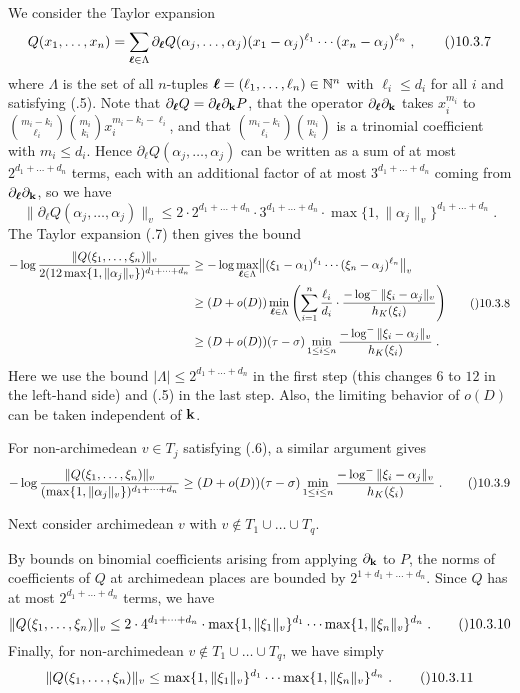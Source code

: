 We consider the Taylor expansion
$$Q(x_1,\dots,x_n)
  = \sum_{\boldsymbol\ell\in\Lambda}
    \partial_{\boldsymbol\ell}Q(\alpha_j,\dots,\alpha_j)
    (x_1-\alpha_j)^{\ell_1}\dotsm(x_n-\alpha_j)^{\ell_n}\;,\tag\010.3.7$$
where $\Lambda$ is the set of all $n$\snug-tuples
$\boldsymbol\ell=(\ell_1,\dots,\ell_n)\in\Bbb N^n$ with $\ell_i\le d_i$
for all $i$ and satisfying (.5).  Note that
$\partial_{\boldsymbol\ell}Q=\partial_{\boldsymbol\ell}\partial_{\bold k}P$,
that the operator $\partial_{\boldsymbol\ell}\partial_{\bold k}$ takes
$x_i^{m_i}$ to $\binom{m_i-k_i}{\ell_i}\binom{m_i}{k_i}x_i^{m_i-k_i-\ell_i}$,
and that $\binom{m_i-k_i}{\ell_i}\binom{m_i}{k_i}$ is a trinomial coefficient
with $m_i\le d_i$.  Hence $\partial_{\boldsymbol\ell}Q(\alpha_j,\dots,\alpha_j)$
can be written as a sum of at most $2^{d_1+\dots+d_n}$ terms, each with
an additional factor of at most $3^{d_1+\dots+d_n}$ coming from
$\partial_{\boldsymbol\ell}\partial_{\bold k}$, so we have
$$\|\partial_{\boldsymbol\ell}Q(\alpha_j,\dots,\alpha_j)\|_v
  \le 2\cdot2^{d_1+\dots+d_n}\cdot3^{d_1+\dots+d_n}
    \cdot\max\{1,\|\alpha_j\|_v\}^{d_1+\dots+d_n}\;.$$
The Taylor expansion (.7) then gives the bound
$$\split -\log\frac{\|Q(\xi_1,\dots,\xi_n)\|_v}
    {2(12\max\{1,\|\alpha_j\|_v\})^{d_1+\dots+d_n}}
  &\ge - \log\max_{\boldsymbol\ell\in\Lambda}
    \bigl\|(\xi_1-\alpha_1)^{\ell_1}\dotsm(\xi_n-\alpha_j)^{\ell_n}\bigr\|_v \\
  &\ge (D+o(D))\min_{\boldsymbol\ell\in\Lambda}
    \left(\sum_{i=1}^n \frac{\ell_i}{d_i}
    \cdot \frac{-\log^{-}\|\xi_i-\alpha_j\|_v}{h_K(\xi_i)} \right) \\
  &\ge (D+o(D))(\tau-\sigma)\min_{1\le i\le n}
    \frac{-\log^{-}\|\xi_i-\alpha_j\|_v}{h_K(\xi_i)}\;.\endsplit\tag\010.3.8$$
Here we use the bound $|\Lambda|\le 2^{d_1+\dots+d_n}$ in the first step
(this changes $6$ to $12$ in the left-hand side) and (.5) in the last
step.  Also, the limiting behavior of $o(D)$ can be taken independent
of $\bold k$.

For non-archimedean $v\in T_j$ satisfying (.6), a similar argument
gives
$$-\log\frac{\|Q(\xi_1,\dots,\xi_n)\|_v}
    {(\max\{1,\|\alpha_j\|_v\})^{d_1+\dots+d_n}}
  \ge (D+o(D))(\tau-\sigma)\min_{1\le i\le n}
    \frac{-\log^{-}\|\xi_i-\alpha_j\|_v}{h_K(\xi_i)}\;.\tag\010.3.9$$

Next consider archimedean $v$ with $v\notin T_1\cup\dots\cup T_q$.

By bounds on binomial coefficients arising from applying $\partial_{\bold k}$
to $P$, the norms of coefficients of $Q$ at archimedean places are bounded
by $2^{1+d_1+\dots+d_n}$.  Since $Q$ has at most $2^{d_1+\dots+d_n}$ terms,
we have
$$\|Q(\xi_1,\dots,\xi_n)\|_v
  \le 2\cdot 4^{d_1+\dots+d_n}
    \cdot \max\{1,\|\xi_1\|_v\}^{d_1}\dotsm\max\{1,\|\xi_n\|_v\}^{d_n}\;.
  \tag\010.3.10$$
Finally, for non-archimedean $v\notin T_1\cup\dots\cup T_q$, we have simply
$$\|Q(\xi_1,\dots,\xi_n)\|_v
  \le \max\{1,\|\xi_1\|_v\}^{d_1}\dotsm\max\{1,\|\xi_n\|_v\}^{d_n}\;.
  \tag\010.3.11$$

